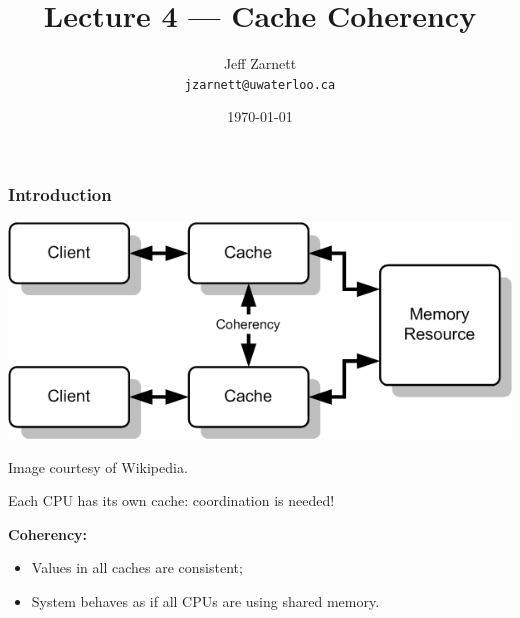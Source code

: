 

\title{Lecture 4 --- Cache Coherency }

\author{Jeff Zarnett \\ \small \texttt{jzarnett@uwaterloo.ca}}
\date{\today}




\begin{frame}
  \titlepage

 \end{frame}

\begin{frame}
  \frametitle{Introduction}

  \begin{center}
    \includegraphics[scale=0.7]{images/coherency}

    Image courtesy of Wikipedia.
  \end{center}
\Large
Each CPU has its own cache: coordination is needed!
  
  {\bf Coherency:}
  \begin{itemize}
    \item Values in all caches are consistent;
    \item System behaves as if all CPUs are using shared memory.
  \end{itemize}
  
\end{frame}

